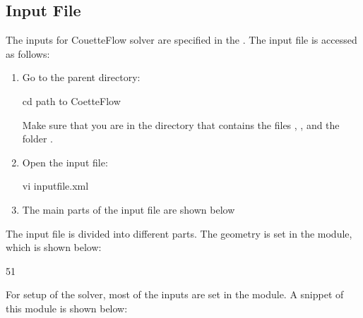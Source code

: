 \documentclass[letterpaper,10pt,english]{sphinxmanual}
\begin{document}
\subsection{Input File}
\label{\detokenize{setup:input}}\label{\detokenize{setup:input-file}}
The inputs for CouetteFlow solver are specified in the . The input file is accessed as follows:
\begin{enumerate}
\item {} 
Go to the parent directory:

\begin{sphinxVerbatim}[commandchars=\\\{\}]
\PYGZdl{} cd \PYGZlt{}path to \textbar{}CoetteFlow\textbar{}\PYGZgt{}
\end{sphinxVerbatim}

Make sure that you are in the directory that contains the files , , and the folder .

\item {} 
Open the input file:

\begin{sphinxVerbatim}[commandchars=\\\{\}]
\PYGZdl{} vi input\PYGZus{}file.xml
\end{sphinxVerbatim}

\item {} 
The main parts of the input file are shown below

\end{enumerate}

The input file is divided into different parts. The geometry is set in the  module, which is shown below:

\begin{sphinxVerbatim}[commandchars=\\\{\}]
  51
\end{sphinxVerbatim}

For setup of the solver, most of the inputs are set in the  module. A  snippet of this module is shown below:
\end{document}
